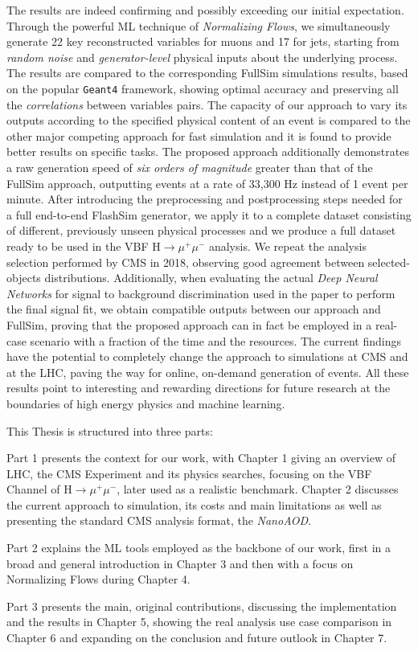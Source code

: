 The results are indeed confirming and possibly exceeding our initial expectation. Through the powerful ML technique of \emph{Normalizing Flows}, we simultaneously generate 22 key reconstructed variables for muons and 17 for jets, starting from \emph{random noise} and \emph{generator-level} physical inputs about the underlying process. The results are compared to the corresponding FullSim simulations results, based on the popular \texttt{Geant4} framework, showing optimal accuracy and preserving all the \emph{correlations} between variables pairs. 
The capacity of our approach to vary its outputs according to the specified physical content of an event is compared to the other major competing approach for fast simulation and it is found to provide better results on specific tasks. The proposed approach additionally demonstrates a raw generation speed of \emph{six orders of magnitude} greater than that of the FullSim approach, outputting events at a rate of 33,300 Hz instead of 1 event per minute. After introducing the preprocessing and postprocessing steps needed for a full end-to-end FlashSim generator, we apply it to a complete dataset consisting of different, previously unseen physical processes and we produce a full dataset ready to be used in the VBF H$\rightarrow\mu^+\mu^-$ analysis. We repeat the analysis selection performed by CMS in 2018, observing good agreement between selected-objects distributions. Additionally, when evaluating the actual \emph{Deep Neural Networks} for signal to background discrimination used in the paper to perform the final signal fit, we obtain compatible outputs between our approach and FullSim, proving that the proposed approach can in fact be employed in a real-case scenario with a fraction of the time and the resources.
The current findings have the potential to completely change the approach to simulations at CMS and at the LHC, paving the way for online, on-demand generation of events. All these results point to interesting and rewarding directions for future research at the boundaries of high energy physics and machine learning.

This Thesis is structured into three parts:

Part 1 presents the context for our work, with Chapter 1 giving an overview of LHC, the CMS Experiment and its physics searches, focusing on the VBF Channel of H$\rightarrow\mu^+\mu^-$, later used as a realistic benchmark. Chapter 2 discusses the current approach to simulation, its costs and main limitations as well as presenting the standard CMS analysis format, the \emph{NanoAOD}.

Part 2 explains the ML tools employed as the backbone of our work, first in a broad and general introduction in Chapter 3 and then with a focus on Normalizing Flows during Chapter 4.

Part 3 presents the main, original contributions, discussing the implementation and the results in Chapter 5, showing the real analysis use case comparison in Chapter 6 and expanding on the conclusion and future outlook in Chapter 7. 

\endgroup

\vfill
